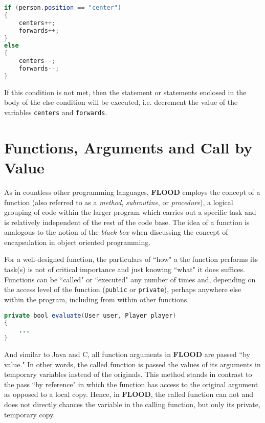 \documentclass[12pt]{report}
\begin{document}
\begin{lstlisting}[language=Java,label=some-code,caption=Bracketed conditionals]
if (person.position == "center")
{
	centers++;
	forwards++;
}
else
{
	centers--;
	forwards--;
}
\end{lstlisting}

\begin{doublespace}
If this condition is not met, then the statement or statements enclosed in the body of the else condition will be executed, i.e. decrement the value of the variables \texttt{centers} and \texttt{forwards}.
\end{doublespace}

\section{Functions, Arguments and Call by Value}

\begin{doublespace}
As in countless other programming languages, \textbf{FLOOD} employs the concept of a function (also referred to as a \textit{method}, \textit{subroutine}, or \textit{procedure}), a logical grouping of code within the larger program which carries out a specific task and is relatively independent of the rest of the code base. The idea of a function is analogous to the notion of the \textit{black box} when discussing the concept of encapsulation in object oriented programming. 

For a well-designed function, the particulars of ``how" a the function performs its task(s) is not of critical importance and just knowing ``what" it does suffices. Functions can be ``called" or ``executed" any number of times and, depending on the access level of the function (\texttt{public} or \texttt{private}), perhaps anywhere else within the program, including from within other functions.
\end{doublespace}

\begin{lstlisting}[language=Java,label=some-code,caption=Syntax of a FLOOD function]
private bool evaluate(User user, Player player)
{
	...
}
\end{lstlisting}

\begin{doublespace}
And similar to Java and C, all function arguments in \textbf{FLOOD} are passed ``by value." In other words, the called function is passed the values of its arguments in temporary variables instead of the originals. This method stands in contrast to the pass ``by reference" in which the function has access to the original argument as opposed to a local copy. Hence, in \textbf{FLOOD}, the called function can not and does not directly chances the variable in the calling function, but only its private, temporary copy.
\end{doublespace}
\end{document}
